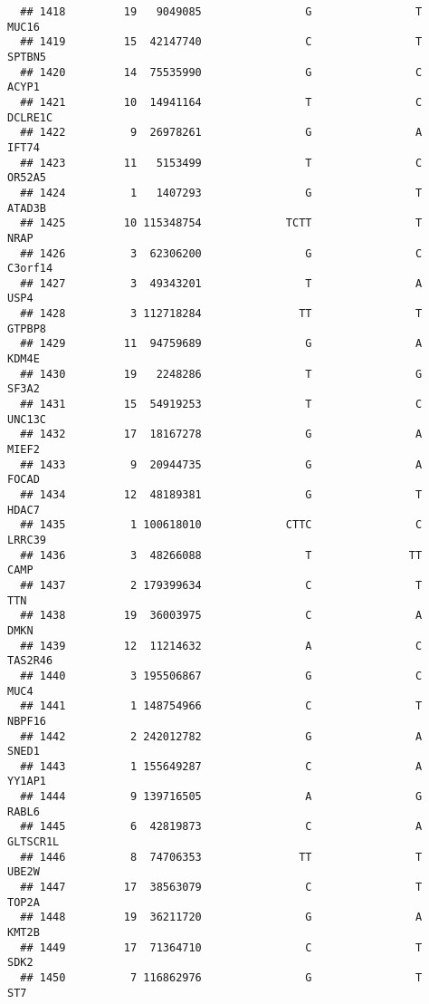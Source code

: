 \documentclass[12pt,twoside]{reedthesis}
\theoremstyle{definition}
\theoremstyle{definition}
\theoremstyle{remark}
\begin{document}
\begin{verbatim}
  ## 1418         19   9049085                G                T          MUC16
  ## 1419         15  42147740                C                T         SPTBN5
  ## 1420         14  75535990                G                C          ACYP1
  ## 1421         10  14941164                T                C        DCLRE1C
  ## 1422          9  26978261                G                A          IFT74
  ## 1423         11   5153499                T                C         OR52A5
  ## 1424          1   1407293                G                T         ATAD3B
  ## 1425         10 115348754             TCTT                T           NRAP
  ## 1426          3  62306200                G                C        C3orf14
  ## 1427          3  49343201                T                A           USP4
  ## 1428          3 112718284               TT                T         GTPBP8
  ## 1429         11  94759689                G                A          KDM4E
  ## 1430         19   2248286                T                G          SF3A2
  ## 1431         15  54919253                T                C         UNC13C
  ## 1432         17  18167278                G                A          MIEF2
  ## 1433          9  20944735                G                A          FOCAD
  ## 1434         12  48189381                G                T          HDAC7
  ## 1435          1 100618010             CTTC                C         LRRC39
  ## 1436          3  48266088                T               TT           CAMP
  ## 1437          2 179399634                C                T            TTN
  ## 1438         19  36003975                C                A           DMKN
  ## 1439         12  11214632                A                C        TAS2R46
  ## 1440          3 195506867                G                C           MUC4
  ## 1441          1 148754966                C                T         NBPF16
  ## 1442          2 242012782                G                A          SNED1
  ## 1443          1 155649287                C                A         YY1AP1
  ## 1444          9 139716505                A                G          RABL6
  ## 1445          6  42819873                C                A       GLTSCR1L
  ## 1446          8  74706353               TT                T          UBE2W
  ## 1447         17  38563079                C                T          TOP2A
  ## 1448         19  36211720                G                A          KMT2B
  ## 1449         17  71364710                C                T           SDK2
  ## 1450          7 116862976                G                T            ST7

\end{verbatim}
\end{document}
